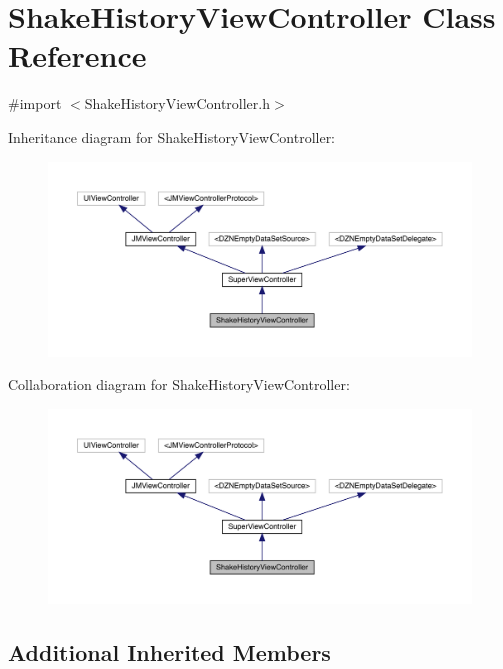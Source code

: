 \hypertarget{interface_shake_history_view_controller}{}\section{Shake\+History\+View\+Controller Class Reference}
\label{interface_shake_history_view_controller}


{\ttfamily \#import $<$Shake\+History\+View\+Controller.\+h$>$}



Inheritance diagram for Shake\+History\+View\+Controller\+:\nopagebreak
\begin{figure}[H]
\begin{center}
\leavevmode
\includegraphics[width=350pt]{interface_shake_history_view_controller__inherit__graph}
\end{center}
\end{figure}


Collaboration diagram for Shake\+History\+View\+Controller\+:\nopagebreak
\begin{figure}[H]
\begin{center}
\leavevmode
\includegraphics[width=350pt]{interface_shake_history_view_controller__coll__graph}
\end{center}
\end{figure}
\subsection*{Additional Inherited Members}


